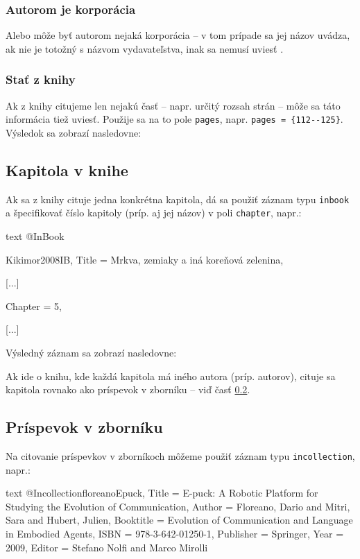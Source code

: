 \noindent[X] 

\subsubsection{Autorom je korporácia}

Alebo môže byť autorom nejaká korporácia -- v tom prípade sa jej názov uvádza, ak nie je totožný s názvom vydavateľstva, inak sa nemusí uviesť \cite{boldis1}.

\subsubsection{Stať z knihy}

Ak z knihy citujeme len nejakú časť -- napr. určitý rozsah strán -- môže sa táto informácia tiež uviesť. Použije sa na to pole \texttt{pages}, napr. \texttt{pages = \{112{-}{-}125\}}. Výsledok sa zobrazí nasledovne:

\noindent[X] 

\subsection{Kapitola v knihe}

Ak sa z knihy cituje jedna konkrétna kapitola, dá sa použiť záznam typu \texttt{inbook} a špecifikovať číslo kapitoly (príp. aj jej názov) v poli \texttt{chapter}, napr.:
\begin{inlinecode}{text}
@InBook{Kikimor2008IB,
  Title                    = {Mrkva, zemiaky a iná koreňová zelenina},
  
  [...]
  
  Chapter                  = {5},
  
  [...]
  
}
\end{inlinecode}

Výsledný záznam sa zobrazí nasledovne:

\noindent[X] 

Ak ide o knihu, kde každá kapitola má iného autora (príp. autorov), cituje sa kapitola rovnako ako príspevok v zborníku -- viď časť \ref{sec:inproc}.

\subsection{Príspevok v zborníku}
\label{sec:inproc}

Na citovanie príspevkov v zborníkoch môžeme použiť záznam typu \texttt{incollection}, napr.:
\begin{inlinecode}{text}
@Incollection{floreanoEpuck,
  Title                    = {E-puck: A Robotic Platform for Studying the Evolution of Communication},
  Author                   = {Floreano, Dario and Mitri, Sara and Hubert, Julien},
  Booktitle                = {Evolution of Communication and Language in Embodied Agents},
  ISBN                     = {978-3-642-01250-1},
  Publisher                = {Springer},
  Year                     = {2009},
  Editor                   = {Stefano Nolfi and Marco Mirolli}
}
\end{inlinecode}

